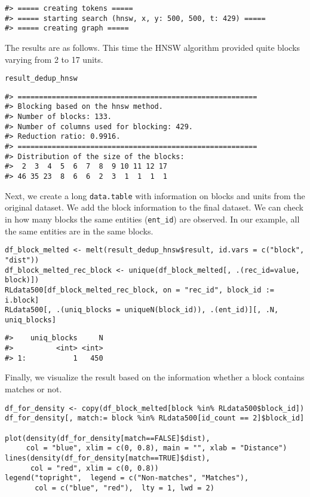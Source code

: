 \begin{verbatim}
#> ===== creating tokens =====
#> ===== starting search (hnsw, x, y: 500, 500, t: 429) =====
#> ===== creating graph =====
\end{verbatim}

The results are as follows. This time the HNSW algorithm provided quite blocks varying from 2 to 17 units.

\begin{verbatim}
result_dedup_hnsw
\end{verbatim}

\begin{verbatim}
#> ========================================================
#> Blocking based on the hnsw method.
#> Number of blocks: 133.
#> Number of columns used for blocking: 429.
#> Reduction ratio: 0.9916.
#> ========================================================
#> Distribution of the size of the blocks:
#>  2  3  4  5  6  7  8  9 10 11 12 17 
#> 46 35 23  8  6  6  2  3  1  1  1  1
\end{verbatim}

Next, we create a long \texttt{data.table} with information on blocks and units from
the original dataset. We add the block information to the final dataset.
We can check in how many blocks the same entities (\texttt{ent\_id}) are
observed. In our example, all the same entities are in the same blocks.

\begin{verbatim}
df_block_melted <- melt(result_dedup_hnsw$result, id.vars = c("block", "dist"))
df_block_melted_rec_block <- unique(df_block_melted[, .(rec_id=value, block)])
RLdata500[df_block_melted_rec_block, on = "rec_id", block_id := i.block]
RLdata500[, .(uniq_blocks = uniqueN(block_id)), .(ent_id)][, .N, uniq_blocks]
\end{verbatim}

\begin{verbatim}
#>    uniq_blocks     N
#>          <int> <int>
#> 1:           1   450
\end{verbatim}

Finally, we visualize the result based on the information whether a
block contains matches or not.

\begin{verbatim}
df_for_density <- copy(df_block_melted[block %in% RLdata500$block_id])
df_for_density[, match:= block %in% RLdata500[id_count == 2]$block_id]

plot(density(df_for_density[match==FALSE]$dist),
     col = "blue", xlim = c(0, 0.8), main = "", xlab = "Distance")
lines(density(df_for_density[match==TRUE]$dist),
      col = "red", xlim = c(0, 0.8))
legend("topright",  legend = c("Non-matches", "Matches"), 
       col = c("blue", "red"),  lty = 1, lwd = 2)
\end{verbatim}

